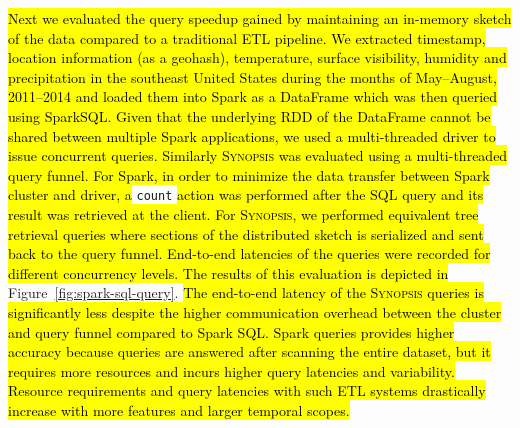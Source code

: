 \hl{Next we evaluated the query speedup gained by maintaining an in-memory sketch of the data compared to a traditional ETL pipeline.
We extracted timestamp, location information (as a geohash), temperature, surface visibility, humidity and precipitation in the southeast United States during the months of May--August, 2011--2014 and loaded them into Spark as a DataFrame which was then queried using SparkSQL.
Given that the underlying RDD of the DataFrame cannot be shared between multiple Spark applications, we used a multi-threaded driver to issue concurrent queries.
Similarly \textsc{Synopsis} was evaluated using a multi-threaded query funnel.
For Spark, in order to minimize the data transfer between Spark cluster and driver, a} \texttt{count} \hl{action was performed after the SQL query and its result was retrieved at the client.
For \textsc{Synopsis}, we performed equivalent tree retrieval queries where sections of the distributed sketch is serialized and sent back to the query funnel.
End-to-end latencies of the queries were recorded for different concurrency levels.
The results of this evaluation is depicted in} Figure~\ref{fig:spark-sql-query}.
\hl{The end-to-end latency of the \textsc{Synopsis} queries is significantly less despite the higher communication overhead between the cluster and query funnel compared to Spark SQL.
Spark queries provides higher accuracy because queries are answered after scanning the entire dataset, but it requires more resources and incurs higher query latencies and variability.
Resource requirements and query latencies with such ETL systems drastically increase with more features and larger temporal scopes.}


